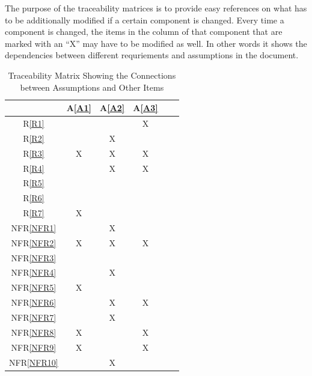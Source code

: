 \documentclass[12pt]{article}
\newcommand{\aref}[1]{A\ref{#1}}
\newcommand{\frref}[1]{R\ref{#1}}
\newcommand{\nfrref}[1]{NFR\ref{#1}}
\begin{document}
The purpose of the traceability matrices is to provide easy references on what
has to be additionally modified if a certain component is changed. Every time a
component is changed, the items in the column of that component that are marked
with an ``X'' may have to be modified as well. In other words it shows the dependencies 
between different requriements and assumptions in the document. 


\newpage
\noindent
\begin{landscape}
\begin{table}[h!]
	\centering
	\begin{tabular}{|c|c|c|c|c|c}
	\hline
		& \aref{A1}& \aref{A2}& \aref{A3} \\
	\hline          %
	\frref{R1}       &   &   & X  \\ \hline
	\frref{R2}       &   & X&    \\ \hline
	\frref{R3}       & X& X& X  \\ \hline
	\frref{R4}       &   & X& X  \\ \hline
	\frref{R5}       &   &   &    \\ \hline
	\frref{R6}       &   &   &    \\ \hline
	\frref{R7}       & X&   &     \\ \hline
	\nfrref{NFR1} &   & X&    \\ \hline
	\nfrref{NFR2} & X& X& X \\ \hline
	\nfrref{NFR3} &   &   &     \\ \hline
	\nfrref{NFR4} &   & X&     \\ \hline
	\nfrref{NFR5} &   X&   &      \\ \hline
	\nfrref{NFR6} &   &  X &X     \\ \hline
	\nfrref{NFR7} &   &  X &     \\ \hline
	\nfrref{NFR8} &  X &   &X     \\ \hline
	\nfrref{NFR9} & X  &   &X      \\ \hline
	\nfrref{NFR10}&  & X  &      \\
	\hline
	\end{tabular}
	\caption{Traceability Matrix Showing the Connections between Assumptions and Other Items}
	\label{Table:A_trace}
\end{table}
\end{landscape}
\end{document}
